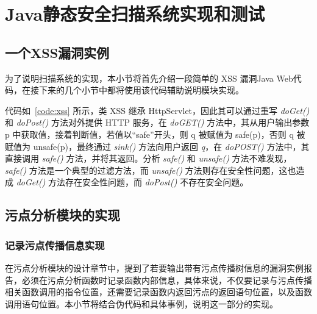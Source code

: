 \chapter{Java静态安全扫描系统实现和测试}
\section{一个XSS漏洞实例}
为了说明扫描系统的实现，本小节将首先介绍一段简单的 XSS 漏洞Java Web代码，在接下来的几个小节中都将使用该代码辅助说明模块实现。

\begin{minipage}[!htbp]{0.9\textwidth}

\end{minipage}

代码如~\ref{code:xss} 所示，类 XSS 继承 HttpServlet，因此其可以通过重写 \textit{doGet()} 和 \textit{doPost()} 方法对外提供 HTTP 服务，在 \textit{doGET()} 方法中，其从用户输出参数 p 中获取值，接着判断值，若值以“safe”开头，则 q 被赋值为 safe(p)，否则 q 被赋值为 unsafe(p)，最终通过 \textit{sink()} 方法向用户返回 \textit{q}，在 \textit{doPOST()} 方法中，其直接调用 \textit{safe()} 方法，并将其返回。分析 \textit{safe()} 和 \textit{unsafe()} 方法不难发现，\textit{safe()} 方法是一个典型的过滤方法，而 \textit{unsafe()} 方法则存在安全性问题，这也造成 \textit{doGet()} 方法存在安全性问题，而 \textit{doPost()} 不存在安全问题。

\section{污点分析模块的实现}\label{sec:taintImp}
\subsection{记录污点传播信息实现}
在污点分析模块的设计章节中，提到了若要输出带有污点传播树信息的漏洞实例报告，必须在污点分析函数时记录函数内部信息，具体来说，不仅要记录与污点传播相关函数调用的指令位置，还需要记录函数内返回污点的返回语句位置，以及函数调用语句位置。本小节将结合伪代码和具体事例，说明这一部分的实现。

